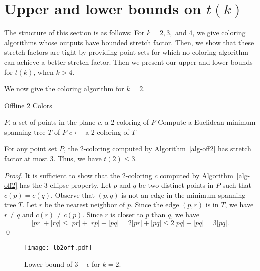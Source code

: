 \documentclass[pdftex,leqno,fleqn,12pts]{llncs}
\begin{document}
\section{Upper and lower bounds on $t(k)$}
\label{section-offline}

The structure of this section is as follows: For $k=2,3,$ and $4$, we 
give coloring algorithms whose outputs have bounded stretch factor. 
Then, we show that these stretch factors are tight by providing point 
sets for which no coloring algorithm can achieve a better stretch 
factor. Then we present our upper and lower bounds for $t(k)$, when $k>4$. 

We now give the coloring algorithm for $k=2$.

\begin{algorithm}
\caption{Offline 2 Colors}\label{alg-off2}
\begin{algorithmic}[1]
\REQUIRE $P$, a set of points in the plane 
\ENSURE $c$, a 2-coloring of $P$ 
\STATE Compute a Euclidean minimum spanning tree $T$ of $P$
\STATE $c \leftarrow$ a 2-coloring of $T$
\end{algorithmic}
\end{algorithm}



\begin{lemma}  \label{prop-ub2off}
For any point set $P$, the 2-coloring computed by 
Algorithm~\ref{alg-off2} has stretch factor at most 3. Thus, we have 
$t(2)\leq 3$.
\end{lemma}
\begin{proof} 
It is sufficient to show that the 2-coloring $c$ computed by
Algorithm~\ref{alg-off2} has the 3-ellipse property. 
Let $p$ and $q$ be two distinct points in $P$ such that $c(p)=c(q)$.  
Observe that $(p,q)$ is not an edge in the minimum spanning tree $T$. 
Let $r$ be the nearest neighbor of $p$. Since the edge $(p,r)$ is in 
$T$, we have $r\neq q$ and $c(r)\neq c(p)$. Since $r$ is closer to $p$ 
than $q$, we have 
\[ |pr|+|rq| \leq |pr|+|rp|+|pq| = 2|pr|+|pq| \leq 2|pq| + |pq|
      =  3|pq| .
\] 
\qed 
\end{proof}


\begin{figure}
\centering\texttt{[image: lb2off.pdf]}\caption{Lower bound of
$3-\epsilon$ for $k=2$.}\label{fig-lb2off}
\end{figure}
\end{document}
